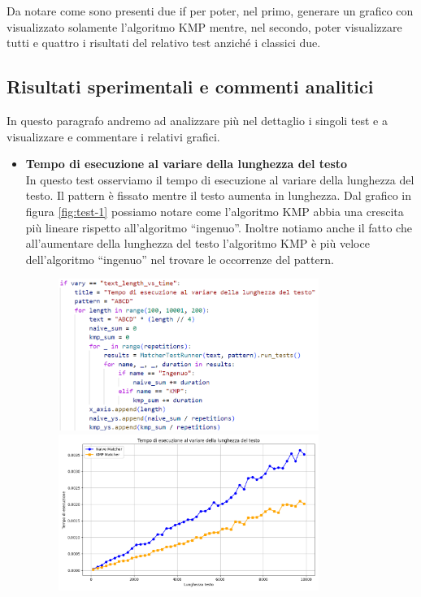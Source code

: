 \documentclass{article}
\begin{document}
\noindent Da notare come sono presenti due if per poter, nel primo, generare un grafico con visualizzato solamente l'algoritmo KMP mentre, nel secondo, poter visualizzare tutti e quattro i risultati del relativo test anziché i classici due.

\newpage
\subsection{Risultati sperimentali e commenti analitici}
In questo paragrafo andremo ad analizzare più nel dettaglio i singoli test e a visualizzare e commentare i relativi grafici.
\begin{itemize}
    \item \textbf{Tempo di esecuzione al variare della lunghezza del testo}\\
        In questo test osserviamo il tempo di esecuzione al variare della lunghezza del testo. Il pattern è fissato mentre il testo aumenta in lunghezza. Dal grafico in figura \ref{fig:test-1} possiamo notare come l'algoritmo KMP abbia una crescita più lineare rispetto all'algoritmo ``ingenuo''. Inoltre notiamo anche il fatto che all'aumentare della lunghezza del testo l'algoritmo KMP è più veloce dell'algoritmo ``ingenuo'' nel trovare le occorrenze del pattern.
        \begin{figure}[H]
            \centering
            \includegraphics[width=0.8\textwidth]{img/Test1.png}
            \includegraphics[width=0.8\textwidth]{img/Graph1.png}

\end{figure}
\end{itemize}
\end{document}
